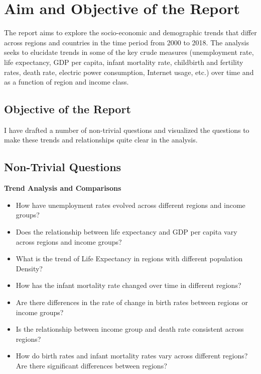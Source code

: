 \documentclass{article}\usepackage[]{graphicx}\usepackage[]{xcolor}
\begin{document}
\newpage


\section{Aim and Objective of the Report}

The report aims to explore the socio-economic and demographic trends that differ across regions and countries in the time period from 2000 to 2018. The analysis seeks to elucidate trends in some of the key crude measures (unemployment rate, life expectancy, GDP per capita, infant mortality rate, childbirth and fertility rates, death rate, electric power consumption, Internet usage, etc.) over time and as a function of region and income class.

\subsection{Objective of the Report}

I have drafted a number of non-trivial questions and visualized the questions to make these trends and relationships quite clear in the analysis.

\subsection{Non-Trivial Questions}

\textbf{Trend Analysis and Comparisons}

\begin{itemize}
    \item How have unemployment rates evolved across different regions and income groups?
    \item Does the relationship between life expectancy and GDP per capita vary across regions and income groups?
    \item What is the trend of Life Expectancy in regions with different population Density?
    \item How has the infant mortality rate changed over time in different regions?
    \item Are there differences in the rate of change in birth rates between regions or income groups?
    \item Is the relationship between income group and death rate consistent across regions?
    \item{How do birth rates and infant mortality rates vary across different regions? Are there significant differences between regions?}
\end{itemize}
\end{document}
